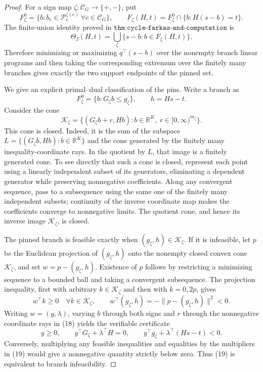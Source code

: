 \documentclass{article}
\begin{document}
\begin{proof}
For a sign map \(\zeta:\mathcal C_G\to\{+,-\}\), put
\[
 F_{\zeta}^0=\{b:b_c\in\mathcal P_c^{\zeta(c)}\ \forall c\in\mathcal C_G\},
 \qquad
 F_{\zeta}(H,t)=F_{\zeta}^0\cap\{b:H(s-b)=t\}.
\]
The finite-union identity proved in \(\texttt{thm:cycle-farkas-and-computation}\) is
\[
 \Theta_I(H,t)=
 \bigcup_{\zeta}\{s-b:b\in F_{\zeta}(H,t)\}.
\tag{17}
\]
Therefore minimizing or maximizing \(q^{\top}(s-b)\) over the nonempty branch linear programs and then taking the corresponding extremum over the finitely many branches gives exactly the two support endpoints of the pinned set.

We give an explicit primal--dual classification of the pins.  Write a branch as
\[
 F_{\zeta}^0=\{b:G_{\zeta}b\le g_{\zeta}\},
 \qquad h=Hs-t.
\]
Consider the cone
\[
 \mathcal K_{\zeta}
 =\{(G_{\zeta}b+r,Hb):b\in\mathbb R^K,\ r\in[0,\infty)^{m_{\zeta}}\}.
\tag{18}
\]
This cone is closed.  Indeed, it is the sum of the subspace
\(L=\{(G_{\zeta}b,Hb):b\in\mathbb R^K\}\) and the cone generated by the finitely many inequality-coordinate rays.  In the quotient by \(L\), that image is a finitely generated cone.  To see directly that such a cone is closed, represent each point using a linearly independent subset of its generators, eliminating a dependent generator while preserving nonnegative coefficients.  Along any convergent sequence, pass to a subsequence using the same one of the finitely many independent subsets; continuity of the inverse coordinate map makes the coefficients converge to nonnegative limits.  The quotient cone, and hence its inverse image \(\mathcal K_{\zeta}\), is closed.

The pinned branch is feasible exactly when \((g_{\zeta},h)\in\mathcal K_{\zeta}\).  If it is infeasible, let \(p\) be the Euclidean projection of \((g_{\zeta},h)\) onto the nonempty closed convex cone \(\mathcal K_{\zeta}\), and set \(w=p-(g_{\zeta},h)\).  Existence of \(p\) follows by restricting a minimizing sequence to a bounded ball and taking a convergent subsequence.  The projection inequality, first with arbitrary \(k\in\mathcal K_{\zeta}\) and then with \(k=0,2p\), gives
\[
 w^{\top}k\ge0\quad\forall k\in\mathcal K_{\zeta},
 \qquad
 w^{\top}(g_{\zeta},h)=-\|p-(g_{\zeta},h)\|^2<0.
\]
Writing \(w=(y,\lambda)\), varying \(b\) through both signs and \(r\) through the nonnegative coordinate rays in (18) yields the verifiable certificate
\[
 y\ge0,
 \qquad
 y^{\top}G_{\zeta}+\lambda^{\top}H=0,
 \qquad
 y^{\top}g_{\zeta}+\lambda^{\top}(Hs-t)<0.
\tag{19}
\]
Conversely, multiplying any feasible inequalities and equalities by the multipliers in (19) would give a nonnegative quantity strictly below zero.  Thus (19) is equivalent to branch infeasibility.


\end{proof}
\end{document}
